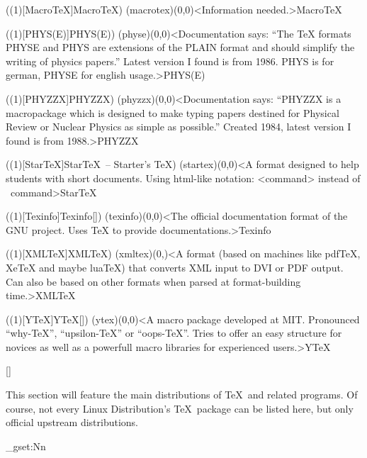 \tograph(\tostruct(1)[Macro\TeX]{Macro\TeX}){
	\tonode(macrotex)(0,0)<Information needed.>{Macro\TeX}
}

\tograph(\tostruct(1)[PHYS(E)]{PHYS(E)}){
	\tonode(physe)(0,0)<Documentation says: “The TeX formats PHYSE and PHYS are extensions of the PLAIN format
and should simplify the writing of physics papers.” Latest version I found is from 1986. PHYS is for german, PHYSE for english usage.>{PHYS(E)}
}

\tograph(\tostruct(1)[PHYZZX]{PHYZZX}){
	\tonode(phyzzx)(0,0)<Documentation says: “PHYZZX is a macropackage which is designed to make typing papers destined for Physical Review or Nuclear Physics as simple as possible.” Created 1984, latest version I found is from 1988.>{PHYZZX}
}

\tograph(\tostruct(1)[Star\TeX]{Star\TeX\ – Starter's \TeX}){
	\tonode(startex)(0,0)<A format designed to help students with short documents. Using html-like notation: <command> instead of \ command>{Star\TeX}
}

\tograph(\tostruct(1)[Texinfo]{Texinfo}[\normalimportant]){
	\tonode(texinfo)(0,0)<The official documentation format of the GNU project. Uses TeX to provide documentations.>{Texinfo}
}

\tograph(\tostruct(1)[XML\TeX]{XML\TeX}){
  \tonode(xmltex)(0,\layer)<A format (based on machines like pdfTeX, XeTeX and maybe luaTeX) that converts XML input to DVI or PDF output. Can also be based on other formats when parsed at format-building time.>{XML\TeX}
}

\tograph(\tostruct(1)[Y\TeX]{Y\TeX}[\experimental]){
	\tonode(ytex)(0,0)<A macro package developed at MIT. Pronounced “why-TeX”, “upsilon-TeX” or “oops-TeX”. Tries to offer an easy structure for novices as well as a powerfull macro libraries for experienced users.>{Y\TeX}
}

\clearpage

[\distro]
\parbox{\textwidth}{\normalsize
This section will feature the main distributions of \TeX\ and related programs. Of course, not every Linux Distribution's \TeX\ package can be listed here, but only official upstream distributions.
}

\ExplSyntaxOn
\fp_gset:Nn
\ExplSyntaxOff

